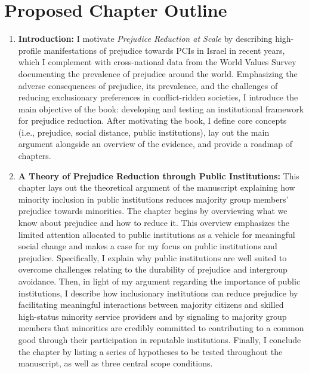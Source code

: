 \documentclass[12pt]{article}
\theoremstyle{plain}
\begin{document}
\section*{Proposed Chapter Outline}
\begin{enumerate}
\item \textbf{Introduction:} I motivate \emph{Prejudice Reduction at Scale} by describing high-profile manifestations of prejudice towards PCIs in Israel in recent years, which I complement with cross-national data from the World Values Survey documenting the prevalence of prejudice around the world. Emphasizing the adverse consequences of prejudice, its prevalence, and the challenges of reducing exclusionary preferences in conflict-ridden societies, I introduce the main objective of the book: developing and testing an institutional framework for prejudice reduction. After motivating the book, I define core concepts (i.e., prejudice, social distance, public institutions), lay out the main argument alongside an overview of the evidence, and provide a roadmap of chapters.







\item \textbf{A Theory of Prejudice Reduction through Public Institutions:} This chapter lays out the theoretical argument of the manuscript explaining how minority inclusion in public institutions reduces majority group members' prejudice towards minorities. The chapter begins by overviewing what we know about prejudice and how to reduce it. This overview emphasizes the limited attention allocated to public institutions as a vehicle for meaningful social change and makes a case for my focus on public institutions and prejudice. Specifically, I explain why public institutions are well suited to overcome challenges relating to the durability of prejudice and intergroup avoidance. Then, in light of my argument regarding the importance of public institutions, I describe how inclusionary institutions can reduce prejudice by facilitating meaningful interactions between majority citizens and skilled high-status minority service providers and by signaling to majority group members that minorities are credibly committed to contributing to a common good through their participation in reputable institutions. Finally, I conclude the chapter by listing a series of hypotheses to be tested throughout the manuscript, as well as three central scope conditions. 




\end{enumerate}
\end{document}
